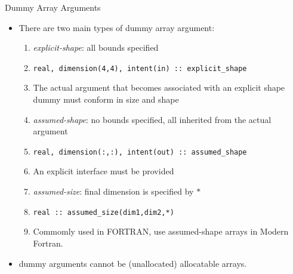 \documentclass[c,mathserif,compress,xcolor=svgnames]{beamer}
\newcommand{\lstfortran}[1]{\lstinline[language={[90]Fortran},basicstyle=\footnotesize\ttfamily]|#1|}
\begin{document}
\begin{frame}[fragile]{Dummy Array Arguments}
  \begin{itemize}
    \item There are two main types of dummy array argument:
    \begin{enumerate}
      \item \textit{explicit-shape}: all bounds specified
      \item[] \lstinline[language={[90]Fortran},basicstyle=\fontsize{7}{8}\selectfont\ttfamily]{real, dimension(4,4), intent(in) :: explicit_shape}
      \item[] The actual argument that becomes associated with an explicit shape dummy must conform in size and shape
      \item \textit{assumed-shape}: no bounds specified, all inherited from the actual argument
      \item[] \lstinline[language={[90]Fortran},basicstyle=\fontsize{7}{8}\selectfont\ttfamily]{real, dimension(:,:), intent(out) :: assumed_shape}
      \item[] An explicit interface must be provided
      \item \textit{assumed-size}: final dimension is specified by $\ast$
      \item[] \lstinline[language={[90]Fortran},basicstyle=\fontsize{7}{8}\selectfont\ttfamily]{real :: assumed_size(dim1,dim2,*)}
      \item[] Commomly used in FORTRAN, use assumed-shape arrays in Modern Fortran.
    \end{enumerate}
    \item dummy arguments cannot be (unallocated) allocatable arrays.
  \end{itemize}
\end{frame}
\end{document}
